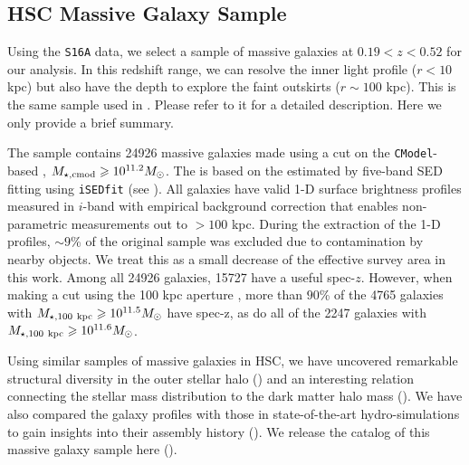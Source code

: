 \documentclass[fleqn,usenatbib,useAMS,english]{mnras}
\begin{document}
\subsection{HSC Massive Galaxy Sample}
    \label{sec:galaxy_sample}

    Using the \texttt{S16A} data, we select a sample of massive galaxies at $0.19 < z <
    0.52$ for our analysis.
    In this redshift range, we can resolve the inner light profile ($r<10$ kpc) but also have the
    depth to explore the faint outskirts ($r \sim 100$ kpc).
    This is the same sample used in \citet{Huang2020}. Please refer to it for a detailed
    description. Here we only provide a brief summary.

    The sample contains 24926 massive galaxies made using a cut on the \texttt{CModel}-based \mstar{},
    $M_{\star,\mathrm{cmod}}{} \geqslant 10^{11.2} M_{\odot}$.
    The \mcmodel{} is based on the \mlratio{} estimated by five-band SED fitting using
    \texttt{iSEDfit} (see \citealt{Moustakas2013}).
    All galaxies have valid 1-D surface brightness profiles measured in $i$-band with empirical
    background correction that enables non-parametric \mstar{} measurements out to $>100$ kpc.
    During the extraction of the 1-D profiles, $\sim 9$\% of the original sample was excluded due to
    contamination by nearby objects. We treat this as a small decrease of the effective survey
    area in this work.
    Among all 24926 galaxies, 15727 have a useful spec-$z$.
    However, when making a cut using the 100 kpc aperture \mstar{}, more than $90$\%
    of the 4765 galaxies with $M_{\star, {100}\ \rm kpc} \geqslant 10^{11.5} M_{\odot}$ have spec-z,
    as do all of the 2247 galaxies with $M_{\star, {100}\ \rm kpc} \geqslant 10^{11.6} M_{\odot}$.

    Using similar samples of massive galaxies in HSC, we have uncovered remarkable structural
    diversity in the outer stellar halo (\citealt{Huang2018b}) and an interesting relation
    connecting the stellar mass distribution to the dark matter halo mass (\citealt{Huang2018c,
    Huang2020}).
    We have also compared the galaxy profiles with those in state-of-the-art hydro-simulations to
    gain insights into their assembly history (\citealt{Ardila2021}).
    We release the catalog of this massive galaxy sample here ().
\end{document}
